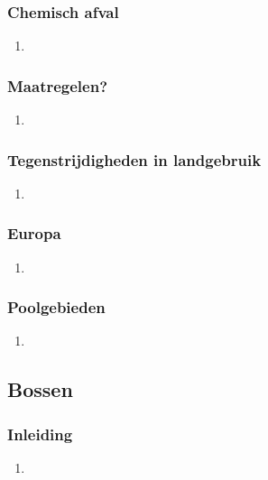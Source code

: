 \documentclass[12pt]{article}
\begin{document}
    \subsubsection{Chemisch afval}
    \begin{enumerate}
        \item 
    \end{enumerate}

    \subsubsection{Maatregelen?}
    \begin{enumerate}
        \item 
    \end{enumerate}

    \subsubsection{Tegenstrijdigheden in landgebruik}
    \begin{enumerate}
        \item 
    \end{enumerate}

    \subsubsection{Europa}
    \begin{enumerate}
        \item 
    \end{enumerate}

    \subsubsection{Poolgebieden}
    \begin{enumerate}
        \item 
    \end{enumerate}


    \subsection{Bossen}
    \subsubsection{Inleiding}
    \begin{enumerate}
        \item 
    \end{enumerate}
\end{document}

